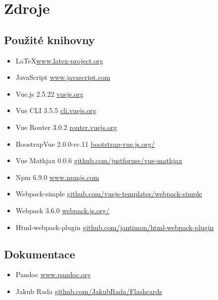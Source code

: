 \section{Zdroje}

\subsection{Použité knihovny}

\begin{itemize}
\tightlist
\item \LaTeX \href{https://www.latex-project.org/}{www.latex-project.org}
\item JavaScript \href{https://www.javascript.com}{www.javascript.com}
\item Vue.js 2.5.22 \href{https://vuejs.org/}{vuejs.org}
\item Vue CLI 3.5.5 \href{https://cli.vuejs.org/}{cli.vuejs.org}
\item Vue Router 3.0.2 \href{https://router.vuejs.org/}{router.vuejs.org}
\item BoostrapVue 2.0.0-rc.11 \href{https://bootstrap-vue.js.org/}{bootstrap-vue.js.org/}
\item Vue Mathjax 0.0.6 \href{https://github.com/justforuse/vue-mathjax}{github.com/justforuse/vue-mathjax}
\item Npm 6.9.0 \href{https://www.npmjs.com/}{www.npmjs.com}
\item Webpack-simple \href{https://github.com/vuejs-templates/webpack-simple}{github.com/vuejs-templates/webpack-simple}
\item Webpack 3.6.0 \href{https://webpack.js.org/}{webpack.js.org/}
\item Html-webpack-plugin \href{https://github.com/jantimon/html-webpack-plugin}{github.com/jantimon/html-webpack-plugin}
\end{itemize}

\subsection{Dokumentace}

\begin{itemize}
\tightlist
\item Pandoc \href{https://pandoc.org/}{www.pandoc.org}
\item Jakub Rada \href{https://github.com/JakubRada/Flashcards/tree/master/documentation/generated/to_submit/pdf}{github.com/JakubRada/Flashcards}
\end{itemize}

